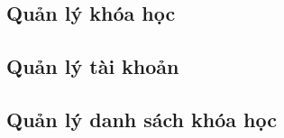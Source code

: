\documentclass[./../main_file.tex]{subfiles}
\begin{document}
	
	\subsection{Quản lý khóa học}
	\begin{figure}[H]
		\centering
		\resizebox{1.0\textwidth}{!}{}
	\end{figure}
	
	
	\subsection{Quản lý tài khoản }
	\begin{figure}[H]
		\centering
		\resizebox{1.0\textwidth}{!}{}
	\end{figure}

	
	\subsection{Quản lý danh sách khóa học}
		\begin{figure}[H]
		\centering
		\resizebox{1.0\textwidth}{!}{}
	\end{figure}

	
\end{document}
